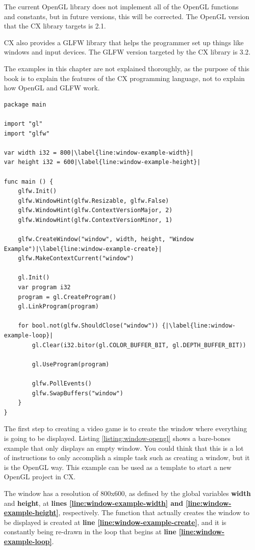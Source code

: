 \documentclass[11pt,fleqn,openany]{book} %
\begin{document}
The current OpenGL library does not implement all of the OpenGL functions and constants, but in future versions, this will be corrected. The OpenGL version that the CX library targets is 2.1.

CX also provides a GLFW library that helps the programmer set up things like windows and input devices. The GLFW version targeted by the CX library is 3.2.

The examples in this chapter are not explained thoroughly, as the purpose of this book is to explain the features of the CX programming language, not to explain how OpenGL and GLFW work.

\begin{lstlisting}[caption={Creating a window using OpenGL},captionpos=b,label={listing:window-opengl}]
package main

import "gl"
import "glfw"

var width i32 = 800|\label{line:window-example-width}|
var height i32 = 600|\label{line:window-example-height}|

func main () {
	glfw.Init()
	glfw.WindowHint(glfw.Resizable, glfw.False)
	glfw.WindowHint(glfw.ContextVersionMajor, 2)
	glfw.WindowHint(glfw.ContextVersionMinor, 1)

	glfw.CreateWindow("window", width, height, "Window Example")|\label{line:window-example-create}|
	glfw.MakeContextCurrent("window")
	
	gl.Init()
	var program i32
	program = gl.CreateProgram()
	gl.LinkProgram(program)
	
	for bool.not(glfw.ShouldClose("window")) {|\label{line:window-example-loop}|
		gl.Clear(i32.bitor(gl.COLOR_BUFFER_BIT, gl.DEPTH_BUFFER_BIT))

		gl.UseProgram(program)

		glfw.PollEvents()
		glfw.SwapBuffers("window")
	}
}
\end{lstlisting}

The first step to creating a video game is to create the window where everything is going to be displayed. Listing \ref{listing:window-opengl} shows a bare-bones example that only displays an empty window. You could think that this is a lot of instructions to only accomplish a simple task such as creating a window, but it is the OpenGL way. This example can be used as a template to start a new OpenGL project in CX.

The window has a resolution of 800x600, as defined by the global variables \textbf{width} and \textbf{height}, at \textbf{lines \ref{line:window-example-width} and \ref{line:window-example-height}}, respectively. The function that actually creates the window to be displayed is created at \textbf{line \ref{line:window-example-create}}, and it is constantly being re-drawn in the loop that begins at \textbf{line \ref{line:window-example-loop}}.
\end{document}
